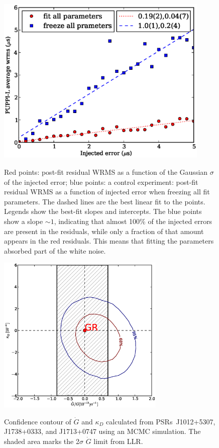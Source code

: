 \documentclass[12pt,preprint]{aastex}
\begin{document}
\begin{figure}
\includegraphics[width=4in]{overfit.eps} \\ 
\caption {\label{fig:overfit} Red points: post-fit residual WRMS as a function of the Gaussian
$\sigma$ of the  injected error; blue points: a control experiment:
post-fit residual WRMS as a function of injected error when freezing all fit
parameters. The dashed lines are the best linear fit to the points. Legends
show the best-fit slopes and intercepts. 
The blue points show a slope $\sim 1$,
indicating that almost 100\% of the injected errors are present in the
residuals, while only a fraction of that amount appears in the red residuals. 
This means that fitting the parameters absorbed part of the white noise.
} 
\end{figure} 

\begin{figure}
\includegraphics[width=8cm]{GdotContour.ps} \\ 
\caption {\label{fig:Gdot} Confidence contour of $\dot{G}$ and $\kappa_D$
calculated from PSRs~J1012+5307, J1738+0333, and J1713+0747 using an MCMC simulation.
The shaded area marks the 2$\sigma$ $\dot{G}$ limit from LLR. 
} 
\end{figure} 







\end{document}
